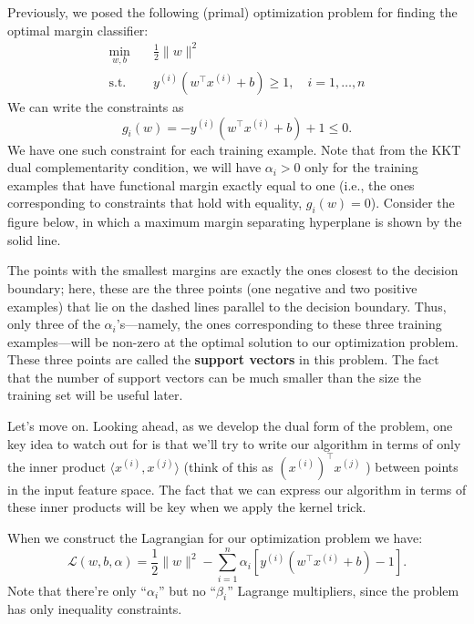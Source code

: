 Previously, we posed the following (primal) optimization problem for finding
the optimal margin classifier:
\begin{align}
    \min_{w,b} \quad& \frac{1}{2}\lVert w \rVert^2\label{eq:opt_margin_classifier}\\
    \operatorname{s.t.} \quad& y^{(i)} (w^\top x^{(i)} + b) \ge 1, \quad i = 1,\ldots ,n
\end{align}
We can write the constraints as
\begin{equation*}
    g_i (w) = -y^{(i)} (w^\top x^{(i)} + b) + 1 \le 0.
\end{equation*}
We have one such constraint for each training example. Note that from the
KKT dual complementarity condition, we will have $\alpha_i > 0$ only for the training
examples that have functional margin exactly equal to one (i.e., the ones
corresponding to constraints that hold with equality, $g_i (w) = 0$). Consider
the figure below, in which a maximum margin separating hyperplane is shown
by the solid line.

The points with the smallest margins are exactly the ones closest to the
decision boundary; here, these are the three points (one negative and two positive
examples) that lie on the dashed lines parallel to the decision boundary.
Thus, only three of the $\alpha_i$'s---namely, the ones corresponding to these three
training examples---will be non-zero at the optimal solution to our optimization
problem. These three points are called the \textbf{support vectors} in this
problem. The fact that the number of support vectors can be much smaller
than the size the training set will be useful later.

Let's move on. Looking ahead, as we develop the dual form of the problem,
one key idea to watch out for is that we'll try to write our algorithm
in terms of only the inner product $\langle x^{(i)} ,x^{(j)} \rangle$ (think of this as $(x^{(i)} )^\top x^{(j)}$ )
between points in the input feature space. The fact that we can express our
algorithm in terms of these inner products will be key when we apply the
kernel trick.

When we construct the Lagrangian for our optimization problem we have:
\begin{equation*}
    \mathcal L(w,b,\alpha) = \frac 1 2 \lVert w \rVert^2 - \sum_{i=1}^n \alpha_i \left[y^{(i)} (w^\top x^{(i)} + b) - 1 \right].\label{eq:lagrangian_svm}
\end{equation*}
Note that there're only ``$\alpha_i$'' but no ``$\beta_i$'' Lagrange multipliers, since the
problem has only inequality constraints.

